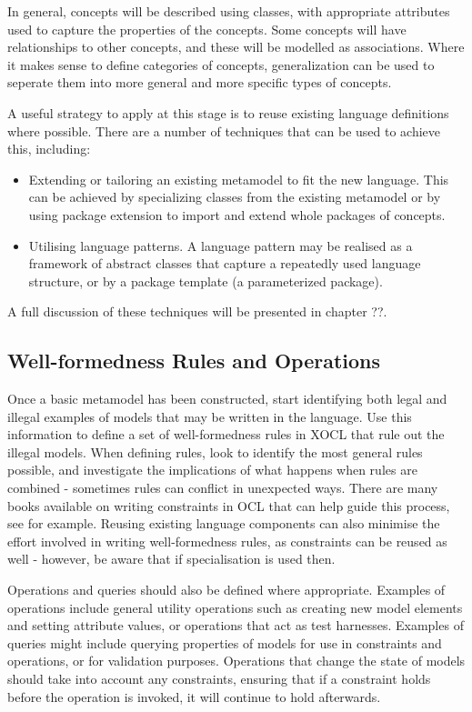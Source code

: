In general, concepts will be described using classes, with appropriate attributes used to capture the properties of the concepts. Some concepts will have relationships to other concepts, and these will be modelled as associations. Where it makes sense to define categories of concepts, generalization can be used to seperate them into more general and more specific types of concepts.

A useful strategy to apply at this stage is to reuse existing language definitions where possible. There are a number of techniques that can be used to achieve this, including:

\begin{itemize}
\item Extending or tailoring an existing metamodel to fit the new language. This can be achieved by specializing classes from the existing metamodel or by using package extension to import and extend whole packages of concepts.
\item Utilising language patterns. A language pattern may be realised as a framework of abstract classes that capture a repeatedly used language structure, or by a package template (a parameterized package).
\end{itemize}

\noindent A full discussion of these techniques will be presented in chapter ??.

\subsection{Well-formedness Rules and Operations}

Once a basic metamodel has been constructed, start identifying both legal and illegal examples of models that may be written in the language. Use this information to define a set of well-formedness rules in XOCL that rule out the illegal models. When defining rules, look to identify the most general rules possible, and investigate the implications of what happens when rules are combined - sometimes rules can conflict in unexpected ways. There are many books available on writing constraints in OCL that can help guide this process, see \cite{Warmer} for example. Reusing existing language components can also minimise the effort involved in writing well-formedness rules, as constraints can be reused as well - however, be aware that if specialisation is used then.

Operations and queries should also be defined where appropriate. Examples of operations include general utility operations such as creating new model elements and setting attribute values, or operations that act as test harnesses. Examples of queries might include querying properties of models for use in constraints and operations, or for validation purposes. Operations that change the state of models should take into account any constraints, ensuring that if a constraint holds before the operation is invoked, it will continue to hold afterwards.

